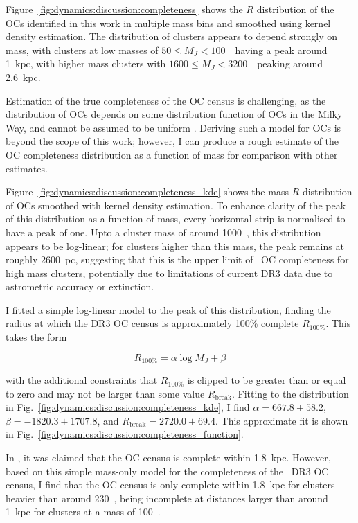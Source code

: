 Figure~\ref{fig:dynamics:discussion:completeness} shows the $R$ distribution of the OCs identified in this work in multiple mass bins and smoothed using kernel density estimation. The distribution of clusters appears to depend strongly on mass, with clusters at low masses of $50 \leq M_J < 100$~\MSun\ having a peak around 1~kpc, with higher mass clusters with $1600 \leq M_J < 3200$~\MSun\ peaking around 2.6~kpc.

Estimation of the true completeness of the OC census is challenging, as the distribution of OCs depends on some distribution function of OCs in the Milky Way, and cannot be assumed to be uniform \cite{anders_milky_2020}. Deriving such a model for OCs is beyond the scope of this work; however, I can produce a rough estimate of the OC completeness distribution as a function of mass for comparison with other estimates.

Figure~\ref{fig:dynamics:discussion:completeness_kde} shows the mass-$R$ distribution of OCs smoothed with kernel density estimation. To enhance clarity of the peak of this distribution as a function of mass, every horizontal strip is normalised to have a peak of one. Upto a cluster mass of around 1000~\MSun, this distribution appears to be log-linear; for clusters higher than this mass, the peak remains at roughly 2600~pc, suggesting that this is the upper limit of \gaia\ OC completeness for high mass clusters, potentially due to limitations of current DR3 data due to astrometric accuracy or extinction.

I fitted a simple log-linear model to the peak of this distribution, finding the radius at which the DR3 OC census is approximately 100\% complete $R_{100\%}$. This takes the form

\begin{equation}
    R_{100\%} = \alpha \log M_J + \beta
\end{equation}

\noindent
with the additional constraints that $R_{100\%}$ is clipped to be greater than or equal to zero and may not be larger than some value $R_\text{break}$. Fitting to the distribution in Fig.~\ref{fig:dynamics:discussion:completeness_kde}, I find $\alpha=667.8\pm58.2$, $\beta=-1820.3\pm1707.8$, and $R_\text{break}=2720.0\pm69.4$. This approximate fit is shown in Fig.~\ref{fig:dynamics:discussion:completeness_function}. 

In \cite{kharchenko_global_2013}, it was claimed that the OC census is complete within 1.8~kpc. However, based on this simple mass-only model for the completeness of the \gaia\ DR3 OC census, I find that the OC census is only complete within 1.8~kpc for clusters heavier than around 230~\MSun, being incomplete at distances larger than around 1~kpc for clusters at a mass of 100~\MSun.


